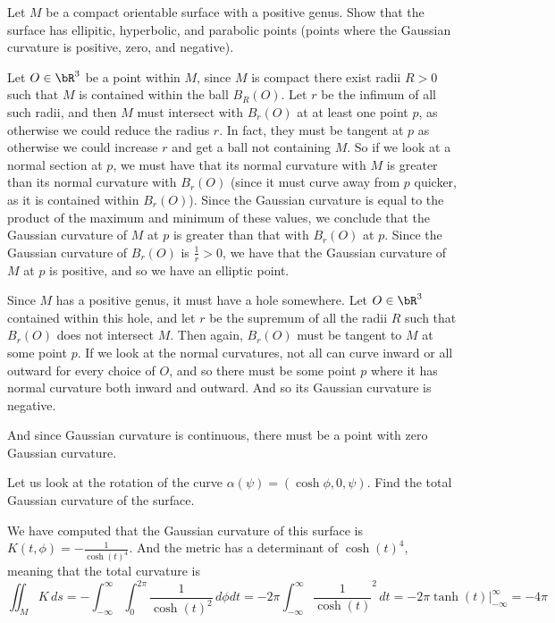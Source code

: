 \documentclass[10pt]{article}
\def\bexerc{\begin{exercise*}}
\def\eexerc{\end{exercise*}}
\begin{document}
\bexerc

    Let $M$ be a compact orientable surface with a positive genus.
    Show that the surface has ellipitic, hyperbolic, and parabolic points (points where the Gaussian curvature is positive, zero, and negative).

\eexerc

Let $O\in\bR^3$ be a point within $M$, since $M$ is compact there exist radii $R>0$ such that $M$ is contained within the ball $B_R(O)$.
Let $r$ be the infimum of all such radii, and then $M$ must intersect with $B_r(O)$ at at least one point $p$, as otherwise we could reduce the radius $r$.
In fact, they must be tangent at $p$ as otherwise we could increase $r$ and get a ball not containing $M$.
So if we look at a normal section at $p$, we must have that its normal curvature with $M$ is greater than its normal curvature with $B_r(O)$ (since it must curve away from $p$ quicker, as it is contained
within $B_r(O)$).
Since the Gaussian curvature is equal to the product of the maximum and minimum of these values, we conclude that the Gaussian curvature of $M$ at $p$ is greater than that with $B_r(O)$ at $p$.
Since the Gaussian curvature of $B_r(O)$ is $\frac1r>0$, we have that the Gaussian curvature of $M$ at $p$ is positive, and so we have an elliptic point.

Since $M$ has a positive genus, it must have a hole somewhere.
Let $O\in\bR^3$ contained within this hole, and let $r$ be the supremum of all the radii $R$ such that $B_r(O)$ does not intersect $M$.
Then again, $B_r(O)$ must be tangent to $M$ at some point $p$.
If we look at the normal curvatures, not all can curve inward or all outward for every choice of $O$, and so there must be some point $p$ where it has normal curvature both inward and outward.
And so its Gaussian curvature is negative.

And since Gaussian curvature is continuous, there must be a point with zero Gaussian curvature.

\bexerc

    Let us look at the rotation of the curve $\alpha(\psi)=(\cosh\phi,0,\psi)$.
    Find the total Gaussian curvature of the surface.

\eexerc

We have computed that the Gaussian curvature of this surface is $K(t,\phi)=-\frac1{\cosh(t)^4}$.
And the metric has a determinant of $\cosh(t)^4$, meaning that the total curvature is
\[ \iint_M K\,ds = -\int_{-\infty}^\infty\int_0^{2\pi}\frac1{\cosh(t)^2}\,d\phi dt = -2\pi\int_{-\infty}^\infty\frac1{\cosh(t)}^2\,dt = -2\pi\tanh(t)\bigl|^\infty_{-\infty} = -4\pi \]
\end{document}
